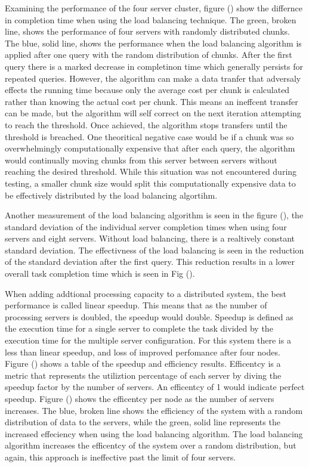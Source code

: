 \documentclass{article}
\begin{document}
\begin{multicols}{2}
Examining the performance of the four server cluster, figure () show the differnce in completion time when using the load balancing technique.  The green, broken line, shows the performance of four servers with randomly distributed chunks. The blue, solid line, shows the performance when the load balancing algorithm is applied after one query with the random distribution of chunks.  After the first query there is a marked decrease in completinon time which generally persists for repeated queries.  However, the algorithm can make a data tranfer that adversaly effects the running time because only the average cost per chunk is calculated rather than knowing the actual cost per chunk. This means an ineffcent transfer can be made, but the algorithm will self correct on the next iteration attempting to reach the threshold. Once achieved, the algorithm stops transfers until the threshold is breached. One theoritical negative case would be if a chunk was so overwhelmingly computationally expensive that after each query, the algorithm would continually moving chunks from this server between servers without reaching the desired threshold.  While this situation was not encountered during testing, a smaller chunk size would split this computationally expensive data to be effectively distributed by the load balancing algortihm. 

Another measurement of the load balancing algorithm is seen in the figure (), the standard deviation of the individual server completion times when using four servers and eight servers.  Without load balancing, there is a realtively constant standard deviation.  The effectivness of the load balancing is seen in the reduction of the standard deviation after the first query.  This reduction results in a lower overall task completion time which is seen in Fig ().

When adding addtional processing capacity to a distributed system, the best performance is called linear speedup.  This means that as the number of processing servers is doubled, the speedup would double. Speedup is defined as the execution time for a single server to complete the task divided by the execution time for the multiple server configuration.  For this system there is a less than linear speedup, and loss of improved perfomance after four nodes.  Figure () shows a table of the speedup and efficiency results.  Efficentcy is a metric that represents the utiliztion percentage of each server by diving the speedup factor by the number of servers.  An efficentcy of 1 would indicate perfect speedup.  Figure () shows the efficentcy per node as the number of servers increases.  The blue, broken line shows the efficiency of the system with a random distribution of data to the servers, while the green, solid line represents the increased effeciency when using the load balancing algorithm.  The load balancing algorithm increases the efficentcy of the system over a random distribution, but again, this approach is ineffective past the limit of four servers.


\end{multicols}
\end{document}
